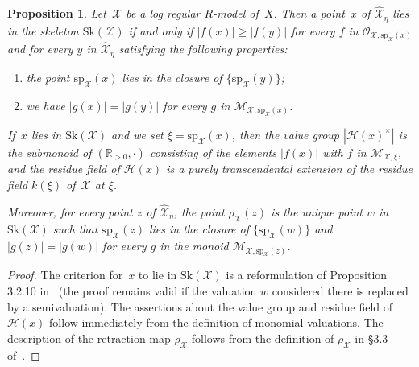 \documentclass[11pt]{article}
\let\mathcal\mathscr
\newtheorem{prop}[equation]{Proposition}
\theoremstyle{definition}
\numberwithin{equation}{subsection}
\newcommand{\R}{\ensuremath{\mathbb{R}}}
\newcommand{\cX}{\ensuremath{\mathscr{X}}}
\newcommand{\Sk}{\mathrm{Sk}}
\newcommand{\spe}{\mathrm{sp}}
\begin{document}
\begin{prop}\label{prop:maxmon}
Let~$\cX$ be a log regular $R$\nobreakdash-model of~$X$. Then a point~$x$ of $\widehat{\cX}_{\eta}$ lies in the skeleton $\Sk(\cX)$ if and only if
$|f(x)|\geq |f(y)|$ for every $f$ in $\mathcal{O}_{\cX,\spe_{\cX}(x)}$ and for every $y$ in $\widehat{\cX}_{\eta}$ satisfying the following properties:
\begin{enumerate}
\item the point $\spe_{\cX}(x)$ lies in the closure of $\{\spe_{\cX}(y)\}$;
\item we have $|g(x)|=|g(y)|$ for every $g$ in $\mathcal{M}_{\cX,\spe_{\cX}(x)}$.
\end{enumerate}
If~$x$ lies in $\Sk(\cX)$ and we set $\xi=\spe_{\cX}(x)$, then the value group $|\mathscr{H}(x)^{\times}|$ is the submonoid of $(\R_{>0},\cdot)$ consisting of the elements $|f(x)|$ with $f$ in $\mathcal{M}_{\cX,\xi}$, and the residue field of $\mathscr{H}(x)$ is a purely transcendental extension of the residue field $k(\xi)$ of~$\cX$ at $\xi$.

Moreover, for every point $z$ of $\widehat{\cX}_{\eta}$, the point $\rho_{\cX}(z)$ is the unique point $w$ in $\Sk(\cX)$ such that $\spe_{\cX}(z)$ lies in the closure of $\{\spe_{\cX}(w)\}$ and $|g(z)|=|g(w)|$ for every $g$ in the monoid $\mathcal{M}_{\cX,\spe_{\cX}(z)}$.
\end{prop}
\begin{proof}
The criterion for~$x$ to lie in $\Sk(\cX)$ is a reformulation of Proposition 3.2.10 in~\cite{BrMa} (the proof remains valid if the valuation $w$ considered there is replaced by a semivaluation). The assertions about the value group and residue field of $\mathscr{H}(x)$ follow immediately from the definition of monomial valuations.
The description of the retraction map $\rho_{\cX}$ follows from the definition of $\rho_{\cX}$ in \S3.3 of~\cite{BrMa}.
\end{proof}
\end{document}
